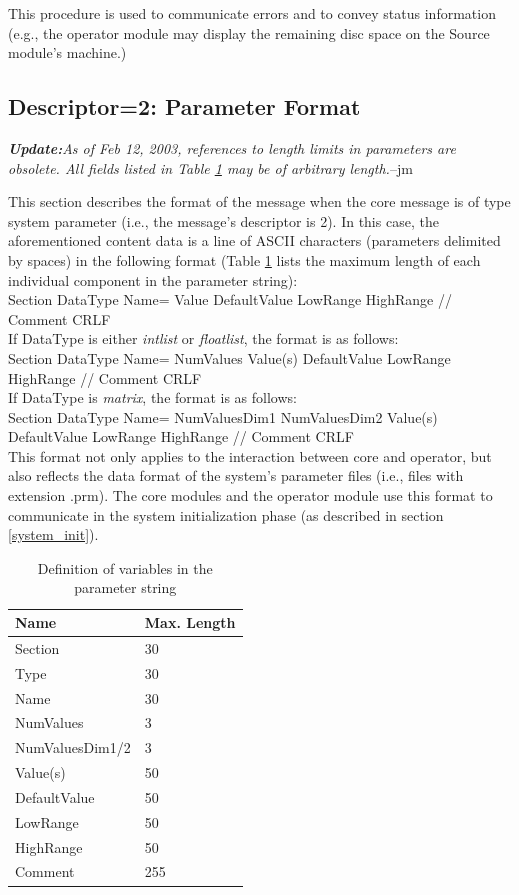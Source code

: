 \documentclass[letterpaper,oneside,12pt]{book}
\begin{document}
This procedure is used to communicate errors and to convey status information (e.g.,
the operator module may display the remaining disc space on the Source module's
machine.)

\subsection{Descriptor=2: Parameter Format}
\label{parameter_format}

\textit{\textbf{Update:}As of Feb 12, 2003, references to length limits in parameters are obsolete.
All fields listed in Table \ref{tab:parametervariables} may be of arbitrary length.}{--jm}

This section describes the format of the message when the core message is of 
type system parameter (i.e., the message's descriptor is 2). In this case, the 
aforementioned content data is a line of ASCII characters (parameters delimited 
by spaces) in the following format (Table \ref{tab:parametervariables} lists the 
maximum length of each individual component in the parameter string):
\\[2ex]
Section DataType Name= Value DefaultValue LowRange HighRange // Comment CRLF \\[2ex]
If DataType is either \textit{intlist} or \textit{floatlist}, the format is
as follows: 
\\[2ex]
Section DataType Name= NumValues Value(s) DefaultValue LowRange HighRange // Comment CRLF \\[2ex]
If DataType is \textit{matrix}, the format is as follows:
\\[2ex]
Section DataType Name= NumValuesDim1 NumValuesDim2 Value(s) DefaultValue LowRange HighRange // Comment CRLF \\[2ex]

This format not only applies to the interaction between core and operator, but
also reflects the data format of the system's parameter files (i.e., files with
extension .prm). The core modules and the operator module use this format to
communicate in the system initialization phase (as described in section \ref{system_init}).

\begin{table}[ht]
 \centering
 \begin{tabular}{|l|l|}
  \hline
  \textbf{Name} & \textbf{Max. Length} \\
  \hline
  Section & 30\\
  \hline
  Type & 30 \\
  \hline
  Name & 30 \\
  \hline
  NumValues & 3 \\
  \hline
  NumValuesDim1/2 & 3 \\
  \hline
  Value(s) & 50 \\
  \hline
  DefaultValue & 50 \\
  \hline
  LowRange & 50 \\
  \hline
  HighRange & 50 \\
  \hline
  Comment & 255 \\
  \hline
 \end{tabular}
 \caption{Definition of variables in the parameter string}
 \label{tab:parametervariables}
\end{table}   
\end{document}
